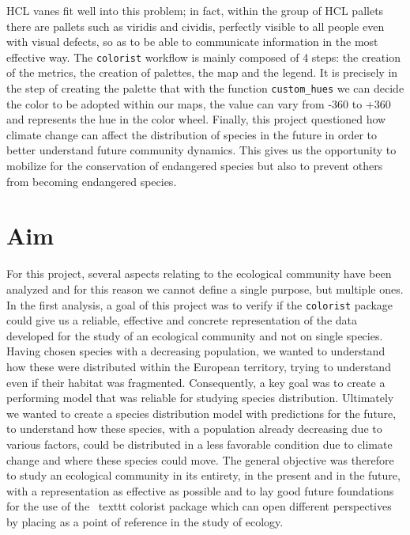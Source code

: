 \documentclass[12pt,a4paper]{article}
\begin{document}
HCL vanes fit well into this problem; in fact, within the group of HCL pallets there are pallets such as viridis and cividis, perfectly visible to all people even with visual defects, so as to be able to communicate information in the most effective way.
The \texttt{colorist} workflow is mainly composed of 4 steps: the creation of the metrics, the creation of palettes, the map and the legend.
It is precisely in the step of creating the palette that with the function \texttt{custom\_hues} we can decide the color to be adopted within our maps, the value can vary from -360 to +360 and represents the hue in the color wheel.
Finally, this project questioned how climate change can affect the distribution of species in the future in order to better understand future community dynamics. This gives us the opportunity to mobilize for the conservation of endangered species but also to prevent others from becoming endangered species.
\section{Aim}
For this project, several aspects relating to the ecological community have been analyzed and for this reason we cannot define a single purpose, but multiple ones.
In the first analysis, a goal of this project was to verify if the \texttt{colorist} package could give us a reliable, effective and concrete representation of the data developed for the study of an ecological community and not on single species.
Having chosen species with a decreasing population, we wanted to understand how these were distributed within the European territory, trying to understand even if their habitat was fragmented.
Consequently, a key goal was to create a performing model that was reliable for studying species distribution.
Ultimately we wanted to create a species distribution model with predictions for the future, to understand how these species, with a population already decreasing due to various factors, could be distributed in a less favorable condition due to climate change and where these species could move.
The general objective was therefore to study an ecological community in its entirety, in the present and in the future, with a representation as effective as possible and to lay good future foundations for the use of the \ texttt {colorist} package which can open different perspectives by placing as a point of reference in the study of ecology.
\end{document}
